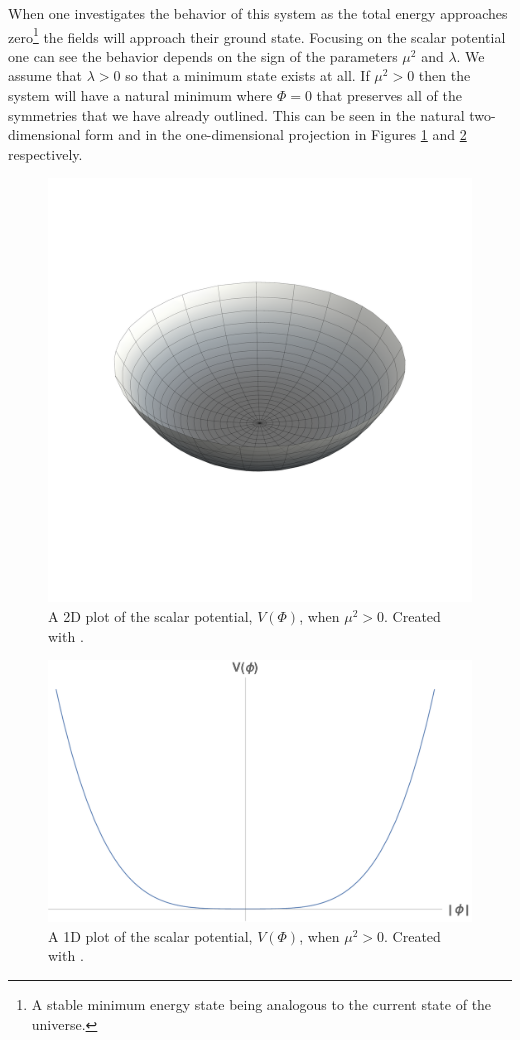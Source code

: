 When one investigates the behavior of this system as the total energy approaches zero\footnote{A stable minimum energy state being analogous to the current state of the universe.} the fields will approach their ground state. Focusing on the scalar potential one can see the behavior depends on the sign of the parameters $\mu^{2}$ and $\lambda$. We assume that $\lambda > 0$ so that a minimum state exists at all. If $\mu^2 > 0$ then the system will have a natural minimum where $\Phi = 0$ that preserves all of the symmetries that we have already outlined. This can be seen in the natural two-dimensional form and in the one-dimensional projection in Figures \ref{fig:2Dsymmetry} and \ref{fig:1Dsymmetry} respectively. 

\begin{figure}
\begin{center}
\includegraphics[width=0.75\linewidth]{Introduction/Non_Mexican_Hat.pdf}
\caption{A 2D plot of the scalar potential, $V\left(\Phi\right)$, when $\mu^2 > 0$. Created with \cite{Mathematica10_1}.}
\label{fig:2Dsymmetry}
\end{center}
\end{figure}

\begin{figure}
\begin{center}
\includegraphics[width=0.75\linewidth]{Introduction/Non_Mexican_Hat_1D.pdf}
\caption{A 1D plot of the scalar potential, $V\left(\Phi\right)$, when $\mu^2 > 0$. Created with \cite{Mathematica10_1}.}
\label{fig:1Dsymmetry}
\end{center}
\end{figure}

